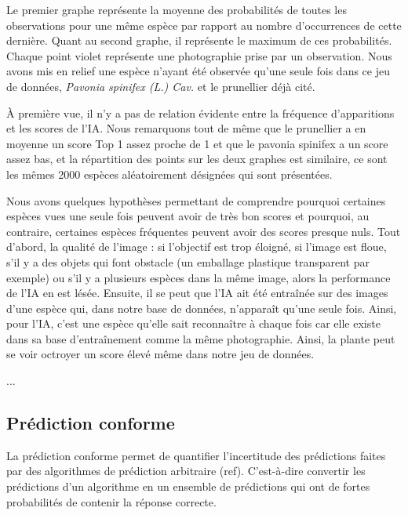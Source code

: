 \documentclass[a4paper,12pt]{article}
\begin{document}
Le premier graphe représente la moyenne des probabilités de toutes les observations pour une même espèce par rapport au nombre d'occurrences de cette dernière. Quant au second graphe, il représente le maximum de ces probabilités. Chaque point violet représente une photographie prise par un observation.
Nous avons mis en relief une espèce n'ayant été observée qu'une seule fois dans ce jeu de données, \textit{Pavonia spinifex (L.) Cav.} et le prunellier déjà cité.

\vspace{2.0cm}

À première vue, il n'y a pas de relation évidente entre la fréquence d'apparitions et les scores de l'IA. Nous remarquons tout de même que le prunellier a en moyenne un score Top 1 assez proche de 1 et que le pavonia spinifex a un score assez bas, et la répartition des points sur les deux graphes est similaire, ce sont les mêmes 2000 espèces aléatoirement désignées qui sont présentées.

\vspace{2.0cm}

Nous avons quelques hypothèses permettant de comprendre pourquoi certaines espèces vues une seule fois peuvent avoir de très bon scores et pourquoi, au contraire, certaines espèces fréquentes peuvent avoir des scores presque nuls. Tout d'abord, la qualité de l'image : si l'objectif est trop éloigné, si l'image est floue, s'il y a des objets qui font obstacle (un emballage plastique transparent par exemple) ou s'il y a plusieurs espèces dans la même image, alors la performance de l'IA en est lésée.
Ensuite, il se peut que l'IA ait été entraînée sur des images d'une espèce qui, dans notre base de données, n'apparaît qu'une seule fois. Ainsi, pour l'IA, c'est une espèce qu'elle sait reconnaître à chaque fois car elle existe dans sa base d'entraînement comme la même photographie. Ainsi, la plante peut se voir octroyer un score élevé même dans notre jeu de données.

...


\subsection{Prédiction conforme}

La prédiction conforme permet de quantifier l'incertitude des prédictions faites par des algorithmes de prédiction arbitraire (ref). C'est-à-dire convertir les prédictions d'un algorithme en un ensemble de prédictions qui ont de fortes probabilités de contenir la réponse correcte.
\end{document}
